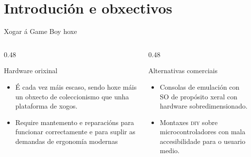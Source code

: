 \section{Introdución e obxectivos}

\begin{frame}{Xogar á Game Boy hoxe}
  \small
  \begin{columns}[t]
    \begin{column}{0.48\textwidth}
      \begin{block}{Hardware orixinal}
        \begin{itemize}
          \item É cada vez máis escaso, sendo hoxe máis un obxecto de
            coleccionismo que unha plataforma de xogos.

            \item Require mantemento e reparacións para funcionar correctamente
          e para suplir as demandas de ergonomía modernas 
        \end{itemize}
      \end{block}
    \end{column}
    \begin{column}{0.48\textwidth}
      \begin{block}{Alternativas comerciais}
        \begin{itemize}
          \item Consolas de emulación con SO de propósito xeral con hardware sobredimensionado.
          \item Montaxes \textsc{diy} sobre microcontroladores con mala accesibilidade para o usuario medio.
        \end{itemize}
      \end{block}
    \end{column}
  \end{columns}
\end{frame}


